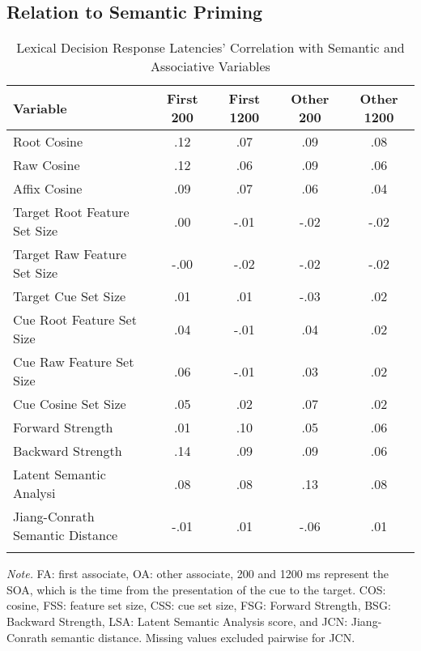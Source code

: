 \documentclass[english,,man]{apa6}
\theoremstyle{definition}
\theoremstyle{definition}
\theoremstyle{definition}
\theoremstyle{remark}
\begin{document}
\hypertarget{relation-to-semantic-priming}{%
\subsection{Relation to Semantic
Priming}\label{relation-to-semantic-priming}}

\begin{table}[tbp]
\begin{center}
\begin{threeparttable}
\caption{\label{tab:ldt-table}Lexical Decision Response Latencies' Correlation with Semantic and Associative Variables}
\begin{tabular}{lcccc}
\toprule
Variable & \multicolumn{1}{c}{First 200} & \multicolumn{1}{c}{First 1200} & \multicolumn{1}{c}{Other 200} & \multicolumn{1}{c}{Other 1200}\\
\midrule
Root Cosine & .12 & .07 & .09 & .08\\
Raw Cosine & .12 & .06 & .09 & .06\\
Affix Cosine & .09 & .07 & .06 & .04\\
Target Root Feature Set Size & .00 & -.01 & -.02 & -.02\\
Target Raw Feature Set Size & -.00 & -.02 & -.02 & -.02\\
Target Cue Set Size & .01 & .01 & -.03 & .02\\
Cue Root Feature Set Size & .04 & -.01 & .04 & .02\\
Cue Raw Feature Set Size & .06 & -.01 & .03 & .02\\
Cue Cosine Set Size & .05 & .02 & .07 & .02\\
Forward Strength & .01 & .10 & .05 & .06\\
Backward Strength & .14 & .09 & .09 & .06\\
Latent Semantic Analysi & .08 & .08 & .13 & .08\\
Jiang-Conrath Semantic Distance & -.01 & .01 & -.06 & .01\\
\bottomrule
\addlinespace
\end{tabular}
\begin{tablenotes}[para]
\normalsize{\textit{Note.} FA: first associate, OA: other associate, 200 and 1200 ms represent the SOA, which is the time from the presentation of the cue to the target. COS: cosine, FSS: feature set size, CSS: cue set size, FSG: Forward Strength, BSG: Backward Strength, LSA: Latent Semantic Analysis score, and JCN: Jiang-Conrath semantic distance. Missing values excluded pairwise for JCN.}
\end{tablenotes}
\end{threeparttable}
\end{center}
\end{table}
\end{document}
